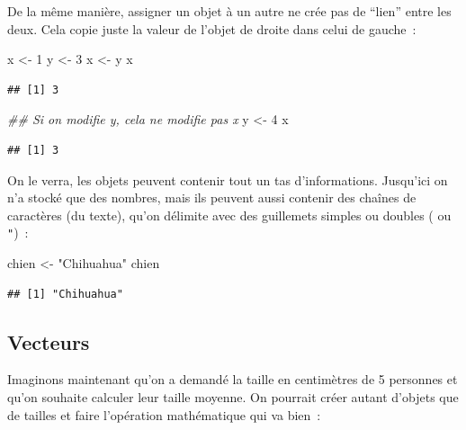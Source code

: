 \documentclass[12pt,]{book}
\newenvironment{Shaded}{\begin{snugshade}}{\end{snugshade}}
\newcommand{\CommentTok}[1]{\textcolor[rgb]{0.37,0.37,0.37}{\textit{#1}}}
\newcommand{\DecValTok}[1]{\textcolor[rgb]{0.06,0.06,0.06}{#1}}
\newcommand{\NormalTok}[1]{#1}
\newcommand{\StringTok}[1]{\textcolor[rgb]{0.5,0.5,0.5}{#1}}
\begin{document}
De la même manière, assigner un objet à un autre ne crée pas de ``lien'' entre les deux. Cela copie juste la valeur de l'objet de droite dans celui de gauche~:

\begin{Shaded}
\begin{Highlighting}[]
\NormalTok{x <-}\StringTok{ }\DecValTok{1}
\NormalTok{y <-}\StringTok{ }\DecValTok{3}
\NormalTok{x <-}\StringTok{ }\NormalTok{y}
\NormalTok{x}
\end{Highlighting}
\end{Shaded}

\begin{verbatim}
## [1] 3
\end{verbatim}

\begin{Shaded}
\begin{Highlighting}[]
\CommentTok{## Si on modifie y, cela ne modifie pas x}
\NormalTok{y <-}\StringTok{ }\DecValTok{4}
\NormalTok{x}
\end{Highlighting}
\end{Shaded}

\begin{verbatim}
## [1] 3
\end{verbatim}

On le verra, les objets peuvent contenir tout un tas d'informations. Jusqu'ici on n'a stocké que des nombres, mais ils peuvent aussi contenir des chaînes de caractères (du texte), qu'on délimite avec des guillemets simples ou doubles (\texttt{\textquotesingle{}} ou \texttt{"})~:

\begin{Shaded}
\begin{Highlighting}[]
\NormalTok{chien <-}\StringTok{ "Chihuahua"}
\NormalTok{chien}
\end{Highlighting}
\end{Shaded}

\begin{verbatim}
## [1] "Chihuahua"
\end{verbatim}

\hypertarget{vecteurs}{%
\subsection{Vecteurs}\label{vecteurs}}

Imaginons maintenant qu'on a demandé la taille en centimètres de 5 personnes et qu'on souhaite calculer leur taille moyenne. On pourrait créer autant d'objets que de tailles et faire l'opération mathématique qui va bien~:
\end{document}
